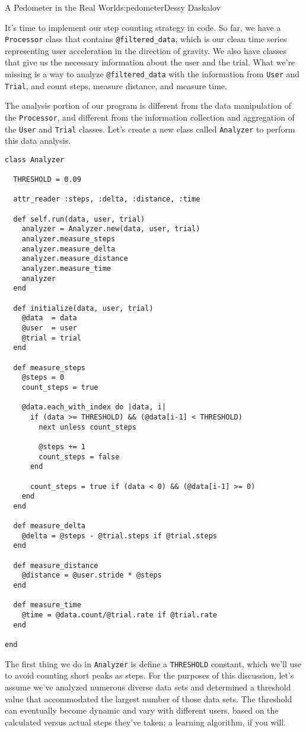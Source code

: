 \begin{aosachapter}{A Pedometer in the Real World}{s:pedometer}{Dessy Daskalov}
\label{steps-taken}

It's time to implement our step counting strategy in code. So far, we
have a \texttt{Processor} class that contains \texttt{@filtered\_data},
which is our clean time series representing user acceleration in the
direction of gravity. We also have classes that give us the necessary
information about the user and the trial. What we're missing is a way to
analyze \texttt{@filtered\_data} with the information from \texttt{User}
and \texttt{Trial}, and count steps, measure distance, and measure time.

The analysis portion of our program is different from the data
manipulation of the \texttt{Processor}, and different from the
information collection and aggregation of the \texttt{User} and
\texttt{Trial} classes. Let's create a new class called
\texttt{Analyzer} to perform this data analysis.

\begin{verbatim}
class Analyzer

  THRESHOLD = 0.09

  attr_reader :steps, :delta, :distance, :time

  def self.run(data, user, trial)
    analyzer = Analyzer.new(data, user, trial)
    analyzer.measure_steps
    analyzer.measure_delta
    analyzer.measure_distance
    analyzer.measure_time
    analyzer
  end

  def initialize(data, user, trial)
    @data  = data
    @user  = user
    @trial = trial
  end

  def measure_steps
    @steps = 0
    count_steps = true

    @data.each_with_index do |data, i|
      if (data >= THRESHOLD) && (@data[i-1] < THRESHOLD)
        next unless count_steps

        @steps += 1
        count_steps = false
      end

      count_steps = true if (data < 0) && (@data[i-1] >= 0)
    end
  end

  def measure_delta
    @delta = @steps - @trial.steps if @trial.steps
  end

  def measure_distance
    @distance = @user.stride * @steps
  end

  def measure_time
    @time = @data.count/@trial.rate if @trial.rate
  end

end
\end{verbatim}

The first thing we do in \texttt{Analyzer} is define a
\texttt{THRESHOLD} constant, which we'll use to avoid counting short
peaks as steps. For the purposes of this discussion, let's assume we've
analyzed numerous diverse data sets and determined a threshold value
that accommodated the largest number of those data sets. The threshold
can eventually become dynamic and vary with different users, based on
the calculated versus actual steps they've taken; a learning algorithm,
if you will.


\end{aosachapter}
